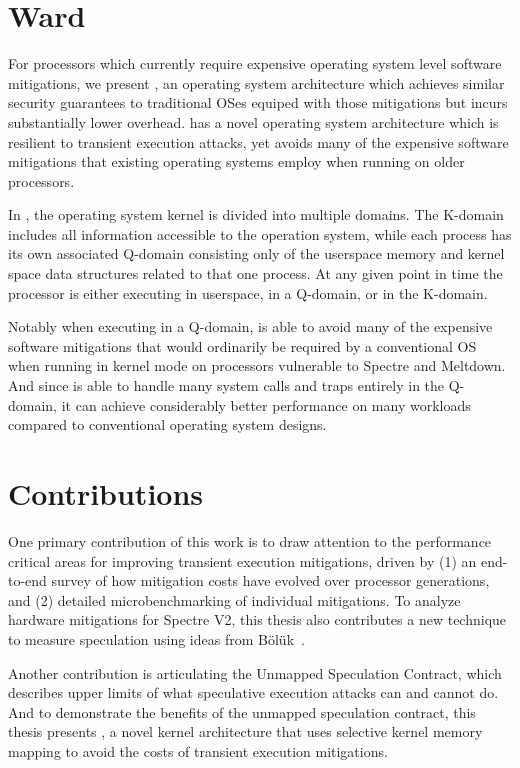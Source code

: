 \section{Ward}
For processors which currently require expensive operating system level software mitigations, we present \sys, an operating system architecture which achieves similar security guarantees to traditional OSes equiped with those mitigations but incurs substantially lower overhead.
\sys has a novel operating system architecture which is resilient to transient execution attacks, yet avoids many of the expensive software mitigations that existing operating systems employ when running on older processors. 

In \sys, the operating system kernel is divided into multiple domains.
The K-domain includes all information accessible to the operation system, while each process has its own associated Q-domain consisting only of the userspace memory and kernel space data structures related to that one process.
At any given point in time the processor is either executing in userspace, in a Q-domain, or in the K-domain. 

Notably when executing in a Q-domain, \sys is able to avoid many of the expensive software mitigations that would ordinarily be required by a conventional OS when running in kernel mode on processors vulnerable to Spectre and Meltdown.
And since \sys is able to handle many system calls and traps entirely in the Q-domain, it can achieve considerably better performance on many workloads compared to conventional operating system designs.

\section{Contributions}

One primary contribution of this work is to draw attention to the
performance critical areas for improving transient execution
mitigations, driven by (1) an end-to-end survey of how mitigation
costs have evolved over processor generations, and (2) detailed
microbenchmarking of individual mitigations.  To analyze hardware
mitigations for Spectre V2, this thesis also contributes a new technique to measure
speculation using ideas from Bölük~\cite{speculating-x86}.

Another contribution is articulating the Unmapped Speculation Contract, which describes upper limits of what speculative execution attacks can and cannot do. 
And to demonstrate the benefits of the unmapped speculation contract,
this thesis presents \sys{}, a novel kernel architecture that uses
selective kernel memory mapping to avoid the costs of transient execution
mitigations.

